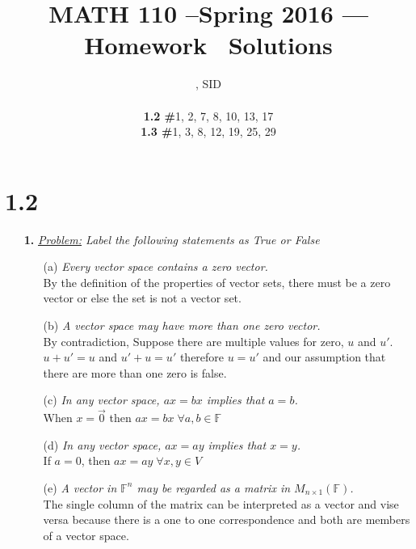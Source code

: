 \documentclass[11pt, fleqn]{article}
\title{MATH 110 --Spring 2016 --- Homework \Homework\ Solutions}
\author{\large{\Name, SID \SID}\\\small{\parbox{0cm}{\begin{tabbing}\textbf{1.2 \#}1, 2, 7, 8, 10, 13, 17\\\textbf{1.3 \#}1, 3, 8, 12, 19, 25, 29\end{tabbing}}}}
\date{}
\begin{document}
\maketitle
\section*{1.2}
\begin{itemize}
    \setlength\itemsep{5ex}
    \item [\textbf{1.}]
    \textit{\underline{Problem:} Label the following statements as True or False}
    \begin{itemize}
        \item[(a)] \textit{Every vector space contains a zero vector.}\\[1ex]
            \textbf{} By the definition of the properties of vector sets, there must be a zero vector or else the set is not a vector set.\vspace{2ex}
            
        \item[(b)] \textit{A vector space may have more than one zero vector.}\\[1ex]
            \textbf{} By contradiction, Suppose there are multiple values for zero, $u$ and $u'$. $u + u' = u$ and $u' + u = u'$ therefore $u=u'$ and our assumption that there are more than one zero is false.\vspace{2ex}
            
        \item[(c)] \textit{In any vector space, $ax = bx$ implies that $a = b$.}\\[1ex]
            \textbf{} When $x=\vec{0}$ then $ax=bx\;\forall a,b \in \mathbb{F}$\vspace{2ex}
            
        \item[(d)] \textit{In any vector space, $ax = ay$ implies that $x = y$.}\\[1ex]
            \textbf{} If $a = 0$, then $ax=ay\;\forall x,y \in V$\vspace{2ex}
            
        \item[(e)] \textit{A vector in $\mathbb{F}^n$ may be regarded as a matrix in $M_{n\times1}(\mathbb{F})$.}\\[1ex]
            \textbf{} The single column of the matrix can be interpreted as a vector and vise versa because there is a one to one correspondence and both are members of a vector space.\vspace{2ex}
            

\end{itemize}
\end{itemize}
\end{document}
